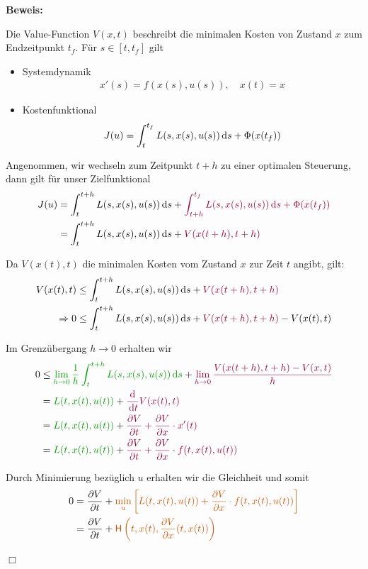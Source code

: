 \documentclass[a4paper, 12pt]{scrartcl}
\newenvironment{beweis}{
    \begin{mdframed}[
            style=mystyle,
            leftmargin=-10pt,
            linecolor=gruen
        ]
        \textbf{Beweis:} %
        }{
        \hfill $\Box$
    \end{mdframed}
}
\newcommand{\gruen}[2][gruen]{\textcolor{#1}{#2}}
\newcommand{\orange}[2][orange]{\textcolor{#1}{#2}}
\newcommand{\dunkelrot}[2][dunkelrot]{\textcolor{#1}{#2}}
\newcommand{\dt}{\thinspace \mathrm{d}t}
\newcommand{\ds}{\thinspace \mathrm{d}s}
\begin{document}
\begin{beweis}
    Die Value-Function $V(x,t)$ beschreibt die minimalen Kosten von Zustand $x$ zum Endzeitpunkt $t_f$.  Für $s \in [t,t_f]$ gilt
    \begin{itemize}
        \item Systemdynamik
        \begin{align*}
            x'(s) = f(x(s), u(s)), \quad x(t) = x
        \end{align*}

        \item Kostenfunktional
        \begin{align*}
            J(u) = \int_t^{t_f} L(s,x(s),u(s)) \ds + \Phi(x(t_f))
        \end{align*}
    \end{itemize}

    Angenommen, wir wechseln zum Zeitpunkt $t+h$ zu einer optimalen Steuerung, dann gilt für unser Zielfunktional 
    \begin{align*}
        J(u) 
        &= \int_{t}^{t+h} L(s,x(s),u(s)) \ds + \dunkelrot{\int_{t+h}^{t_f} L(s,x(s),u(s)) \ds + \Phi(x(t_f)) } \\
        &= \int_{t}^{t+h} L(s,x(s),u(s)) \ds + \dunkelrot{V(x(t+h),t+h)} 
    \end{align*}

    Da $V(x(t), t)$ die minimalen Kosten vom Zustand $x$ zur Zeit $t$ angibt, gilt:
    \begin{align*}
        V(x(t),t) 
        &\leq \int_{t}^{t+h} L(s,x(s),u(s)) \ds + \dunkelrot{V(x(t+h),t+h)} \\
        \Rightarrow 0 &\leq \int_{t}^{t+h} L(s,x(s),u(s)) \ds + \dunkelrot{V(x(t+h),t+h)} - V(x(t),t) 
    \end{align*}

    Im Grenzübergang $h \to 0$ erhalten wir
    \begin{align*}
        0 &\leq \gruen{\lim_{h \to 0}  \frac{1}{h}  \int_{t}^{t+h} L(s,x(s),u(s)) \ds} + \dunkelrot{\lim_{h \to 0} \frac{ V(x(t+h),t+h) - V(x,t) }{h}} \\
        &= \gruen{ L(t,x(t),u(t))} + \dunkelrot{\frac{\mathrm{d}}{\dt} V(x(t),t)} \\
        &= \gruen{ L(t,x(t),u(t))} + \dunkelrot{\frac{\partial V}{\partial t}  + \frac{\partial V}{\partial x} \cdot x'(t)} \\
        &= \gruen{ L(t,x(t),u(t))} + \dunkelrot{\frac{\partial V}{\partial t}  + \frac{\partial V}{\partial x} \cdot f(t,x(t), u(t))}
    \end{align*}

    Durch Minimierung bezüglich $u$ erhalten wir die Gleichheit und somit
    \begin{align*}
        0 &= \frac{\partial V}{\partial t} + \orange{\min_{u} \left[L(t,x(t),u(t)) +  \frac{\partial V}{\partial x} \cdot f(t,x(t), u(t))   \right]} \\
        &= \frac{\partial V}{\partial t} + \orange{\textsf{H}\left(t,x(t) , \frac{\partial V}{\partial x}(t,x(t)) \right)}
    \end{align*}
\end{beweis}
\end{document}

